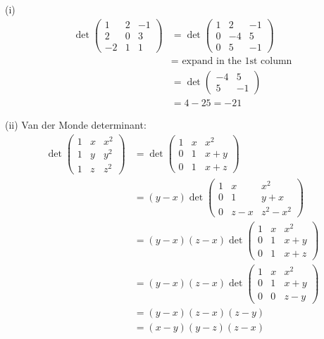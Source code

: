 \documentclass[10pt]{scrartcl}
\begin{document}
\begin{examples}
(i)
\begin{align*}
  \det\begin{pmatrix}
1 & 2 & -1 \\ 2 & 0 & 3\\ -2 & 1 & 1	
\end{pmatrix} &= 
\det\begin{pmatrix}
1 & 2 & -1 \\ 0 & -4 & 5\\ 0 & 5 & -1	
\end{pmatrix}\\
&= \text{ expand in the 1st column}\\
&= \det\begin{pmatrix}
-4 & 5 \\ 5 & -1	
\end{pmatrix}\\
&= 4-25 = -21
\end{align*}

(ii) Van der Monde determinant: 
\begin{align*}
  \det\begin{pmatrix}
1 & x & x^2 \\ 1 & y & y^2 \\ 1 & z & z^2	
\end{pmatrix}&= 
\det\begin{pmatrix}
1 & x & x^2\\ 0 & 1 & x+y \\ 0 & 1 & x+z	
\end{pmatrix}\\[0.2cm]
&= (y-x)\det\begin{pmatrix}
1 & x & x^2 \\ 0 & 1 & y+x\\ 0 & z-x & z^2-x^2	
\end{pmatrix}\\[0.2cm]
&= (y-x)(z-x)\det\begin{pmatrix}
1 & x & x^2 \\ 0 & 1 & x+y\\ 0 & 1 & x+z	
\end{pmatrix}\\[0.2cm]
&= (y-x)(z-x)\det\begin{pmatrix}
1 & x & x^2\\ 0 & 1 & x+y \\ 0 & 0 & z-y	
\end{pmatrix}\\[0.2cm]
&= (y-x)(z-x)(z-y)\\
&= (x-y)(y-z)(z-x)
\end{align*}	
\end{examples}\vsp
\end{document}
